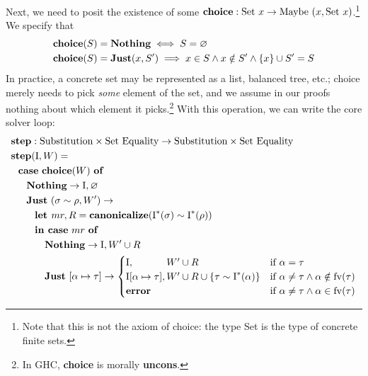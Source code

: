 \documentclass[10pt, letterpaper, oneside]{article}
\newcommand{\inertset}{\text{I}}
\newcommand{\fv}{\mathrm{fv}}
\begin{document}
Next, we need to posit the existence of some \(\text{\bf choice} : \text{Set}~x \to \text{Maybe}~(x, \text{Set}~x)\).\footnote{Note that this is not the axiom of choice: the type Set is the type of concrete finite sets.} We specify that
\begin{align*}
  \text{\bf choice}(S) &= \text{\bf Nothing} \iff S = \varnothing\\
  \text{\bf choice}(S) &= \text{\bf Just}(x, S^\prime) \implies x \in S \land x \notin S^\prime \land \{x\} \cup S^\prime = S
\end{align*}
In practice, a concrete set may be represented as a list, balanced tree, etc.; choice merely needs to pick \emph{some} element of the set, and we assume in our proofs nothing about which element it picks.\footnote{In GHC, \textbf{choice} is morally \textbf{uncons}.} With this operation, we can write the core solver loop:
\begin{align*}
  \text{\bf step} &: \text{Substitution} \times \text{Set}~\text{Equality} \to \text{Substitution} \times \text{Set}~\text{Equality}\\
  \text{\bf step}&(\inertset, W) =\\
      &\!\!\!\!\!\!\!\!\text{\bf case}~\text{\bf choice}(W)~\text{\bf of}\\
      &\!\!\!\text{\bf Nothing} \to \inertset, \varnothing\\
      &\!\!\!\text{\bf Just}~(\sigma \sim \rho, W^\prime) \to\\
      &~\text{\bf let }mr, R = \text{\bf canonicalize}(\inertset^\ast(\sigma) \sim \inertset^\ast(\rho))\\
      &~\text{\bf in }\text{\bf case}~mr~\text{\bf of}\\
      &~~~~\text{\bf Nothing} \to \inertset, W^\prime \cup R\\
      &~~~~\text{\bf Just}~[\alpha \mapsto \tau] \to
        \begin{cases}
          \inertset,\phantom{[\alpha \mapsto \tau]} W^\prime \cup R & \text{if }\alpha = \tau\\
          \inertset[\alpha \mapsto \tau], W^\prime \cup R \cup \{\tau \sim \inertset^\ast(\alpha)\} & \text{if }\alpha \ne \tau \land \alpha \notin \fv(\tau)\\
          \text{\bf error} & \text{if }\alpha \ne \tau \land \alpha \in \fv(\tau)
        \end{cases}
\end{align*}
\end{document}
